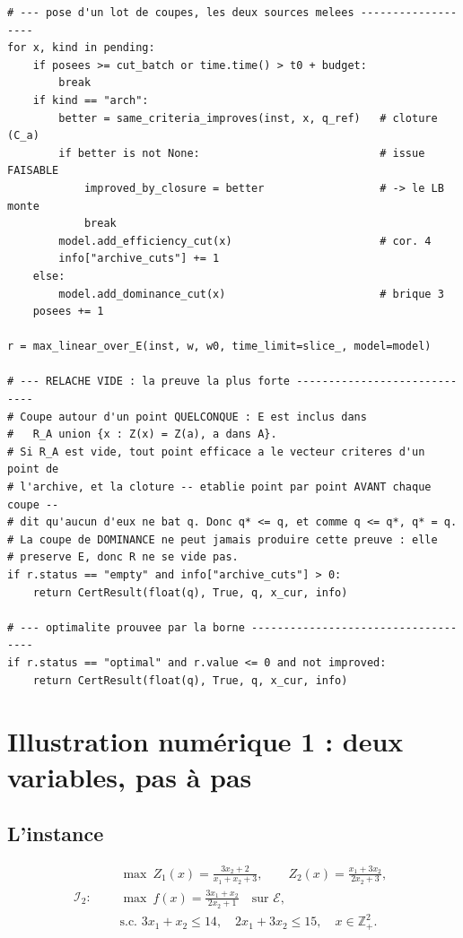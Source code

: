\documentclass[11pt,a4paper]{article}
\theoremstyle{plain}
\theoremstyle{remark}
\newcommand{\Ecal}{\mathcal{E}}
\begin{document}
\begin{lstlisting}[caption={Le c\oe ur de la boucle de certification : pose
des coupes, puis les deux issues de preuve (Alg.~\ref{alg:cert}).},
label={lst:cert}]
# --- pose d'un lot de coupes, les deux sources melees -------------------
for x, kind in pending:
    if posees >= cut_batch or time.time() > t0 + budget:
        break
    if kind == "arch":
        better = same_criteria_improves(inst, x, q_ref)   # cloture (C_a)
        if better is not None:                            # issue FAISABLE
            improved_by_closure = better                  # -> le LB monte
            break
        model.add_efficiency_cut(x)                       # cor. 4
        info["archive_cuts"] += 1
    else:
        model.add_dominance_cut(x)                        # brique 3
    posees += 1

r = max_linear_over_E(inst, w, w0, time_limit=slice_, model=model)

# --- RELACHE VIDE : la preuve la plus forte -----------------------------
# Coupe autour d'un point QUELCONQUE : E est inclus dans
#   R_A union {x : Z(x) = Z(a), a dans A}.
# Si R_A est vide, tout point efficace a le vecteur criteres d'un point de
# l'archive, et la cloture -- etablie point par point AVANT chaque coupe --
# dit qu'aucun d'eux ne bat q. Donc q* <= q, et comme q <= q*, q* = q.
# La coupe de DOMINANCE ne peut jamais produire cette preuve : elle
# preserve E, donc R ne se vide pas.
if r.status == "empty" and info["archive_cuts"] > 0:
    return CertResult(float(q), True, q, x_cur, info)

# --- optimalite prouvee par la borne ------------------------------------
if r.status == "optimal" and r.value <= 0 and not improved:
    return CertResult(float(q), True, q, x_cur, info)
\end{lstlisting}

\section{Illustration numérique 1 : deux variables, pas à pas}
\label{sec:illus2}

\subsection{L'instance}

\[
\mathcal{I}_2:\quad
\begin{aligned}
  &\max\ Z_1(x)=\frac{3x_2+2}{x_1+x_2+3},
   \qquad Z_2(x)=\frac{x_1+3x_2}{2x_2+3},\\[3pt]
  &\max\ f(x)=\frac{3x_1+x_2}{2x_2+1}
   \quad\text{sur }\Ecal,\\[3pt]
  &\text{s.c. } 3x_1+x_2\le 14,\quad 2x_1+3x_2\le 15,
   \quad x\in\mathbb{Z}^2_+ .
\end{aligned}
\]
\end{document}
